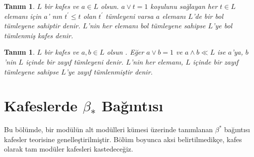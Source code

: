 \documentclass[a4paper,12pt]{article}
\numberwithin{equation}{section}
\theoremstyle{italik}
\newtheorem{tanim}[teorem]{Tanım}
\begin{document}

\begin{tanim}
    $ L $ bir kafes ve $ a \in L $ olsun. $ a \vee t = 1 $ koşulunu sağlayan her $ t \in L $ elemanı için 
    $ a $' nın $ t^{'} \leq t $ olan $ t^{'} $ tümleyeni varsa $ a $ elemanı $ L $'de bir bol tümleyene sahiptir denir. 
    $ L $'nin her elemanı bol tümleyene sahipse $ L $'ye \textit{bol tümlenmiş kafes} denir.
\end{tanim}


\begin{tanim}
  $ L $ bir kafes ve $ a,b \in L $ olsun . Eğer $a \vee b =1 $ ve $ a \wedge b \ll L $ ise $ a $'ya, $ b $'nin $ L $ içinde bir
      \textit{zayıf tümleyeni} denir. $L$'nin her elemanı, $L$ içinde bir zayıf tümleyene sahipse $L$'ye \textit{zayıf tümlenmiştir} denir.
\end{tanim}


\section{Kafeslerde $ \beta_* $ Bağıntısı}
\indent Bu bölümde, bir modülün alt modülleri kümesi üzerinde tanımlanan $ \beta^* $ bağıntısı 
kafesler teorisine genelleştirilmiştir. Bölüm boyunca aksi belirtilmedikçe, 
kafes olarak tam modüler kafesleri kastedeceğiz.
\end{document}
